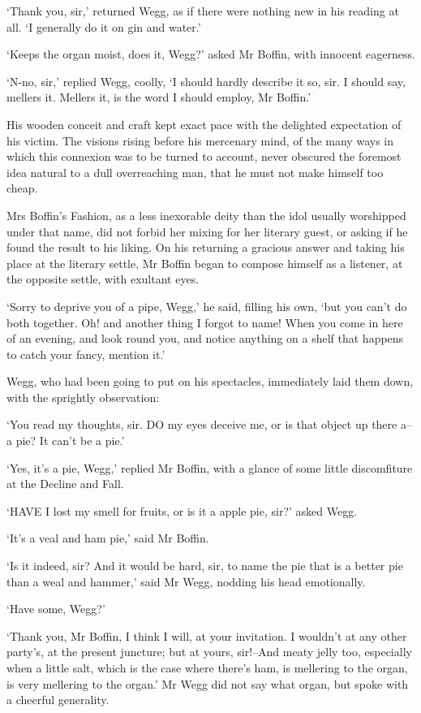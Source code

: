 ‘Thank you, sir,’ returned Wegg, as if there were nothing new in his
reading at all. ‘I generally do it on gin and water.’

‘Keeps the organ moist, does it, Wegg?’ asked Mr Boffin, with innocent
eagerness.

‘N-no, sir,’ replied Wegg, coolly, ‘I should hardly describe it so, sir.
I should say, mellers it. Mellers it, is the word I should employ, Mr
Boffin.’

His wooden conceit and craft kept exact pace with the delighted
expectation of his victim. The visions rising before his mercenary mind,
of the many ways in which this connexion was to be turned to account,
never obscured the foremost idea natural to a dull overreaching man,
that he must not make himself too cheap.

Mrs Boffin’s Fashion, as a less inexorable deity than the idol usually
worshipped under that name, did not forbid her mixing for her literary
guest, or asking if he found the result to his liking. On his returning
a gracious answer and taking his place at the literary settle, Mr Boffin
began to compose himself as a listener, at the opposite settle, with
exultant eyes.

‘Sorry to deprive you of a pipe, Wegg,’ he said, filling his own, ‘but
you can’t do both together. Oh! and another thing I forgot to name! When
you come in here of an evening, and look round you, and notice anything
on a shelf that happens to catch your fancy, mention it.’

Wegg, who had been going to put on his spectacles, immediately laid them
down, with the sprightly observation:

‘You read my thoughts, sir. DO my eyes deceive me, or is that object up
there a--a pie? It can’t be a pie.’

‘Yes, it’s a pie, Wegg,’ replied Mr Boffin, with a glance of some little
discomfiture at the Decline and Fall.

‘HAVE I lost my smell for fruits, or is it a apple pie, sir?’ asked
Wegg.

‘It’s a veal and ham pie,’ said Mr Boffin.

‘Is it indeed, sir? And it would be hard, sir, to name the pie that is
a better pie than a weal and hammer,’ said Mr Wegg, nodding his head
emotionally.

‘Have some, Wegg?’

‘Thank you, Mr Boffin, I think I will, at your invitation. I wouldn’t
at any other party’s, at the present juncture; but at yours, sir!--And
meaty jelly too, especially when a little salt, which is the case where
there’s ham, is mellering to the organ, is very mellering to the organ.’
Mr Wegg did not say what organ, but spoke with a cheerful generality.

